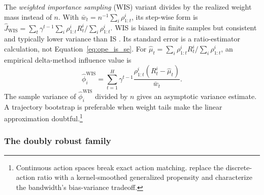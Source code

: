 The \emph{weighted importance sampling} (WIS) variant divides by the realized weight mass instead of $n$. With $\bar w_t=n^{-1}\sum_i\rho^i_{1:t}$, its step-wise form is $\hat J_{\mathrm{WIS}}=\sum_t\gamma^{t-1}\sum_i\rho^i_{1:t}R_t^i/\sum_i\rho^i_{1:t}$. WIS is biased in finite samples but consistent and typically lower variance than IS \citep{jiangli2016doubly, thomas2015hcope}. Its standard error is a ratio-estimator calculation, not Equation~\eqref{eq:ope_is_se}. For $\hat\mu_t=\sum_i\rho^i_{1:t}R_t^i/\sum_i\rho^i_{1:t}$, an empirical delta-method influence value is
\[
\hat\phi_i^{\mathrm{WIS}}
=\sum_{t=1}^{H}\gamma^{t-1}
\frac{\rho^i_{1:t}(R_t^i-\hat\mu_t)}{\bar w_t}.
\]
The sample variance of $\hat\phi_i^{\mathrm{WIS}}$ divided by $n$ gives an asymptotic variance estimate. A trajectory bootstrap is preferable when weight tails make the linear approximation doubtful.\footnote{Continuous action spaces break exact action matching. \citet{kalluszhou2018continuous} replace the discrete-action ratio with a kernel-smoothed generalized propensity and characterize the bandwidth's bias-variance tradeoff.}

\subsubsection*{The doubly robust family}

